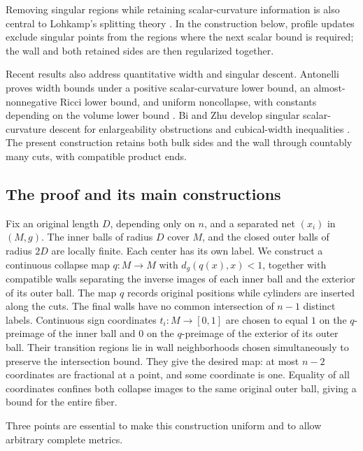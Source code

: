 \documentclass[11pt]{article}
\numberwithin{equation}{section}
\theoremstyle{definition}
\theoremstyle{remark}
\begin{document}
Removing singular regions while retaining scalar-curvature information
is also central to Lohkamp's splitting theory
\citep[\S1.2 and Theorem~3.15]{lohkamp2022SplittingsII}.
In the construction below, profile updates exclude singular points from
the regions where the next scalar bound is required; the wall and both
retained sides are then regularized together.

Recent results also address quantitative width and singular descent.
Antonelli proves width bounds under a positive scalar-curvature lower
bound, an almost-nonnegative Ricci lower bound, and uniform noncollapse,
with constants depending on the volume lower bound
\citep[Theorem~1.4]{antonelli2026Volume}.
Bi and Zhu develop singular scalar-curvature descent for enlargeability
obstructions and cubical-width inequalities
\citep[Theorem~B and Section~4]{biZhu2026}.
The present construction retains both bulk sides and the wall through
countably many cuts, with compatible product ends.

\subsection{The proof and its main constructions}

Fix an original length \(D\), depending only on \(n\), and a separated
net \((x_i)\) in \((M,g)\). The inner balls of radius \(D\) cover \(M\),
and the closed outer balls of radius \(2D\) are locally finite. Each
center has its own label. We construct a continuous collapse map
$q:M\to M$ with $d_g(q(x),x)<1$, together with compatible walls
separating the inverse images of each inner ball and the exterior of
its outer ball. The map $q$ records original positions while cylinders
are inserted along the cuts. The final
walls have no common intersection of \(n-1\) distinct labels. Continuous
sign coordinates $t_i:M\to[0,1]$ are chosen to equal $1$ on the
$q$-preimage of the inner ball and $0$ on the $q$-preimage of the exterior
of its outer ball. Their transition regions lie in wall neighborhoods
chosen simultaneously to preserve the intersection bound. They give the
desired map: at most \(n-2\) coordinates
are fractional at a point, and some coordinate is one. Equality of all
coordinates confines both collapse images to the same original outer
ball, giving a bound for the entire fiber.

Three points are essential to make this construction uniform and to
allow arbitrary complete metrics.
\end{document}
